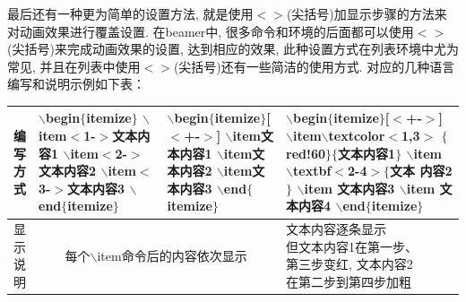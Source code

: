最后还有一种更为简单的设置方法, 就是使用$<>$(尖括号)加显示步骤的方法来对动画效果进行覆盖设置. 在beamer中, 很多命令和环境的后面都可以使用$<>$(尖括号)来完成动画效果的设置, 达到相应的效果, 此种设置方式在列表环境中尤为常见, 并且在列表中使用$<>$(尖括号)还有一些简洁的使用方式. 对应的几种语言编写和说明示例如下表：\\
\begin{center}
\begin{tabular}{c|l|l|l}
 \hline
  \makecell{编\\写\\方\\式} & \makecell[l]{$\backslash$begin$\{$itemize$\}$\\
	$\backslash$item$<$1-$>$文本内容1\\
	$\backslash$item$<$2-$>$文本内容2\\
	$\backslash$item$<$3-$>$文本内容3\\
	$\backslash$end$\{$itemize$\}$}
 & \makecell[l]{$\backslash$begin$\{$itemize$\}$[$<$+-$>$]\\
	$\backslash$item文本内容1\\
	$\backslash$item文本内容2\\
	$\backslash$item文本内容3\\
	$\backslash$end$\{$itemize$\}$}
  & \makecell[l]{$\backslash$begin$\{$itemize$\}$[$<$+-$>$]\\
	$\backslash$item$\backslash$textcolor$<$1,3$>$\\
$\{$red!60$\}\{$文本内容1$\}$\\
	$\backslash$item $\backslash$textbf$<$2-4$>\{$文本\\内容2$\}$\\
	$\backslash$item \hspace{5pt}文本内容3\\
   $\backslash$item \hspace{5pt}文本内容4\\
	$\backslash$end$\{$itemize$\}$}
\\\hline
 \makecell{显\\示\\说\\明} & \multicolumn{2}{c|}{每个$\backslash$item命令后的内容依次显示} &\makecell[l]{文本内容逐条显示\\但文本内容1在第一步、\\第三步变红, 文本内容2\\在第二步到第四步加粗}  \\\hline
 \end{tabular}
 \end{center}\medskip

